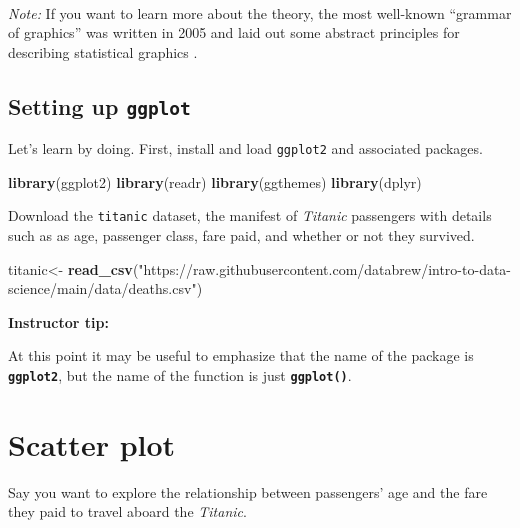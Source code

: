 \documentclass[
]{book}
\newenvironment{Shaded}{\begin{snugshade}}{\end{snugshade}}
\newcommand{\KeywordTok}[1]{\textcolor[rgb]{0.13,0.29,0.53}{\textbf{#1}}}
\newcommand{\NormalTok}[1]{#1}
\newcommand{\StringTok}[1]{\textcolor[rgb]{0.31,0.60,0.02}{#1}}
\begin{document}
~

\emph{Note:} If you want to learn more about the theory, the most well-known ``grammar of graphics'' was written in 2005 and laid out some abstract principles for describing statistical graphics \citep{10.5555/1088896}.

\hypertarget{setting-up-ggplot}{%
\subsection*{\texorpdfstring{Setting up \texttt{ggplot}}{Setting up ggplot}}\label{setting-up-ggplot}}

Let's learn by doing. First, install and load \texttt{ggplot2} and associated packages.

\begin{Shaded}
\begin{Highlighting}[]
\KeywordTok{library}\NormalTok{(ggplot2)}
\KeywordTok{library}\NormalTok{(readr)}
\KeywordTok{library}\NormalTok{(ggthemes)}
\KeywordTok{library}\NormalTok{(dplyr)}
\end{Highlighting}
\end{Shaded}

Download the \texttt{titanic} dataset, the manifest of \emph{Titanic} passengers with details such as as age, passenger class, fare paid, and whether or not they survived.

\begin{Shaded}
\begin{Highlighting}[]
\NormalTok{titanic<-}\StringTok{ }\KeywordTok{read_csv}\NormalTok{(}\StringTok{"https://raw.githubusercontent.com/databrew/intro-to-data-science/main/data/deaths.csv"}\NormalTok{)}
\end{Highlighting}
\end{Shaded}

\leavevmode\hypertarget{tip-text}{}%
\textbf{Instructor tip:}

At this point it may be useful to emphasize that the name of the package is \textbf{\texttt{ggplot2}}, but the name of the function is just \textbf{\texttt{ggplot()}}.

\hypertarget{scatter-plot}{%
\section*{Scatter plot}\label{scatter-plot}}

Say you want to explore the relationship between passengers' age and the fare they paid to travel aboard the \emph{Titanic}.
\end{document}
